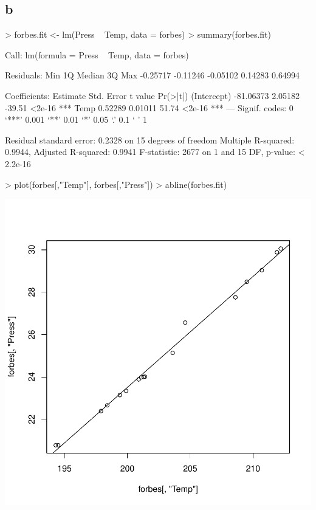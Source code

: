 \subsection{b}
\begin{Schunk}
\begin{Sinput}
> forbes.fit <- lm(Press ~ Temp, data = forbes)
> summary(forbes.fit)
\end{Sinput}
\begin{Soutput}
Call:
lm(formula = Press ~ Temp, data = forbes)

Residuals:
     Min       1Q   Median       3Q      Max 
-0.25717 -0.11246 -0.05102  0.14283  0.64994 

Coefficients:
             Estimate Std. Error t value Pr(>|t|)    
(Intercept) -81.06373    2.05182  -39.51   <2e-16 ***
Temp          0.52289    0.01011   51.74   <2e-16 ***
---
Signif. codes:  0 ‘***’ 0.001 ‘**’ 0.01 ‘*’ 0.05 ‘.’ 0.1 ‘ ’ 1 

Residual standard error: 0.2328 on 15 degrees of freedom
Multiple R-squared: 0.9944,	Adjusted R-squared: 0.9941 
F-statistic:  2677 on 1 and 15 DF,  p-value: < 2.2e-16 
\end{Soutput}
\begin{Sinput}
> plot(forbes[,"Temp"], forbes[,"Press"])
> abline(forbes.fit)
\end{Sinput}
\end{Schunk}
\includegraphics{sw12_1-002}

